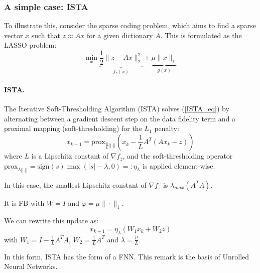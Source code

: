 \documentclass[a4paper,11pt]{article}
\theoremstyle{plain}{\theorembodyfont{\rmfamily}%
\newtheorem{proposition}[theorem]{Proposition}}
\theoremstyle{plain}{\theorembodyfont{\rmfamily}%
\newtheorem{notation}[theorem]{Notation}}
\theoremstyle{plain}{\theorembodyfont{\rmfamily}%
\newtheorem{assumption}[theorem]{Assumption}}
\theoremstyle{plain}{\theorembodyfont{\rmfamily}%
\newtheorem{problem}[theorem]{Problem}}
\theoremstyle{plain}{\theorembodyfont{\rmfamily}%
\newtheorem{example}[theorem]{Example}}
\theoremstyle{plain}{\theorembodyfont{\rmfamily}%
\newtheorem{remark}[theorem]{Remark}}
\theoremstyle{plain}{\theorembodyfont{\rmfamily}%
\newtheorem{definition}[theorem]{Definition}}
\theoremstyle{plain}{\theorembodyfont{\rmfamily}%
\newtheorem{question}[theorem]{Question}}
\numberwithin{equation}{section}
\begin{document}
\subsubsection{A simple case: ISTA}\label{ISTA}

To illustrate this, consider the sparse coding problem, which aims to find a sparse vector $x$ such that $z \approx Ax$ for a given dictionary $A$. This is formulated as the LASSO problem:
\begin{equation}\label{ISTA_eq}
    \min_{x} \underbrace{\frac{1}{2} \| z - Ax \|_2^2}_{f_z(x)} + \underbrace{\mu \| x \|_1}_{g(x)}
\end{equation}

\paragraph{ISTA.}
The Iterative Soft-Thresholding Algorithm (ISTA) \cite{beck2009fast} solves (\ref{ISTA_eq}) by alternating between a gradient descent step on the data fidelity term and a proximal mapping (soft-thresholding) for the $L_1$ penalty:
\begin{equation}
    x_{k+1} = \text{prox}_{\frac{\mu}{L}||.||} \left( x_k - \frac{1}{L} A^T (Ax_k - z) \right)
\end{equation}
where $L$ is a Lipschitz constant of $\nabla f_z$, and the soft-thresholding operator $\text{prox}_{\lambda||.||} = \text{sign}(s) \max(|s| - \lambda, 0) =: \eta_{\lambda}$ is applied element-wise.

\begin{remark}
    In this case, the smallest Lipschitz constant of $\nabla f_z$ is $\lambda_{max}(A^TA)$.
\end{remark}

\begin{remark}
    It is FB with $W=I$ and $\varphi = \mu \|\cdot\|_1$.
\end{remark}

\begin{remark}
We can rewrite this update as:
\begin{equation}\label{ISTA_as_NN}
    x_{k+1} = \eta_{\lambda} \left(W_1 x_k + W_2 z\right)
\end{equation}
with $W_1 = I - \frac{1}{L}A^T A$, $W_2 = \frac{1}{L}A^T$ and $\lambda = \frac{\mu}{L}$.

In this form, ISTA has the form of a FNN. This remark is the basis of Unrolled Neural Networks.
\end{remark}
\end{document}
